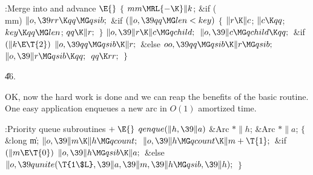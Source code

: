 \B{}:Merge  into  and advance \X${}\E{}$\6
${}\{{}$\1\6
${}\\{mm}\MRL{-{\K}}\|k{}$;\5
\&{if} (\\{mm})\1\5
${}\|o,\39\\{rr}\K\\{qq}\MG\\{qsib};{}$\2\6
\&{if} ${}(\|o,\39\\{qq}\MG\\{len}<\\{key}){}$\5
${}\{{}$\1\6
${}\|r\K\|c{}$;\5
${}\|c\K\\{qq}{}$;\5
${}\\{key}\K\\{qq}\MG\\{len}{}$;\5
${}\\{qq}\K\|r;{}$\6
\4${}\}{}$\2\6
${}\|o,\39\|r\K\|c\MG\\{qchild};{}$\6
${}\|o,\39\|c\MG\\{qchild}\K\\{qq};{}$\6
\&{if} ${}(\|k\E\T{2}){}$\1\5
${}\|o,\39\\{qq}\MG\\{qsib}\K\|r;{}$\2\6
\&{else}\1\5
${}\\{oo},\39\\{qq}\MG\\{qsib}\K\|r\MG\\{qsib};{}$\2\6
${}\|o,\39\|r\MG\\{qsib}\K\\{qq};{}$\6
${}\\{qq}\K\\{rr};{}$\6
\4${}\}{}$\2\par
\U46.\fi

OK, now the hard work is done and we can reap the benefits of the
basic  routine. One easy application enqueues a new arc
in $O(1)$ amortized time.

\Y\B\4:Priority queue subroutines\X${}\mathrel+\E{}$\6
$\\{qenque}(\|h,\39\|a){}$\1\1\6
\&{Arc} ${}{*}\|h{}$;\6
\&{Arc} ${}{*}\|a{}$;\2\2\6
${}\{{}$\5
\1\&{long} \|m;\7
${}\|o,\39\|m\K\|h\MG\\{qcount};{}$\6
${}\|o,\39\|h\MG\\{qcount}\K\|m+\T{1};{}$\6
\&{if} ${}(\|m\E\T{0}){}$\1\5
${}\|o,\39\|h\MG\\{qsib}\K\|a;{}$\2\6
\&{else}\1\5
${}\|o,\39\\{qunite}(\T{1\$L},\39\|a,\39\|m,\39\|h\MG\\{qsib},\39\|h);{}$\2\6
\4${}\}{}$\2\par
\fi

